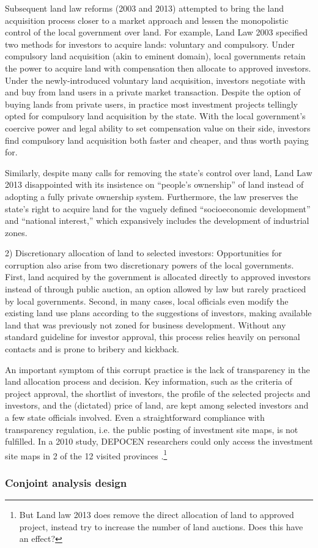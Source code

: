Subsequent land law reforms (2003 and 2013) attempted to bring the land acquisition process closer to a market approach and lessen the monopolistic control of the local government over land. For example, Land Law 2003 specified two methods for investors to acquire lands: voluntary and compulsory. Under compulsory land acquisition (akin to eminent domain), local governments retain the power to acquire land with compensation then allocate to approved investors. Under the newly-introduced voluntary land acquisition, investors negotiate with and buy from land users in a private market transaction. Despite the option of buying lands from private users, in practice most investment projects tellingly opted for compulsory land acquisition by the state. With the local government's coercive power and legal ability to set compensation value on their side, investors find compulsory land acquisition both faster and cheaper, and thus worth paying for.

Similarly, despite many calls for removing the state's control over land, Land Law 2013 disappointed with its insistence on ``people's ownership'' of land instead of adopting a fully private ownership system. Furthermore, the law preserves the state's right to acquire land for the vaguely defined ``socioeconomic development'' and ``national interest,'' which expansively includes the development of industrial zones.

2) Discretionary allocation of land to selected investors: Opportunities for corruption also arise from two discretionary powers of the local governments. First, land acquired by the government is allocated directly to approved investors instead of through public auction, an option allowed by law but rarely practiced by local governments. Second, in many cases, local officials even modify the existing land use plans according to the suggestions of investors, making available land that was previously not zoned for business development. Without any standard guideline for investor approval, this process relies heavily on personal contacts and is prone to bribery and kickback.

An important symptom of this corrupt practice is the lack of transparency in the land allocation process and decision. Key information, such as the criteria of project approval, the shortlist of investors, the profile of the selected projects and investors, and the (dictated) price of land, are kept among selected investors and a few state officials involved. Even a straightforward compliance with transparency regulation, i.e. the public posting of investment site maps, is not fulfilled. In a 2010 study, DEPOCEN researchers could only access the investment site maps in 2 of the 12 visited provinces \citep{Anderson2011}.\footnote{But Land law 2013 does remove the direct allocation of land to approved project, instead try to increase the number of land auctions. Does this have an effect?}

\subsubsection{Conjoint analysis design}

